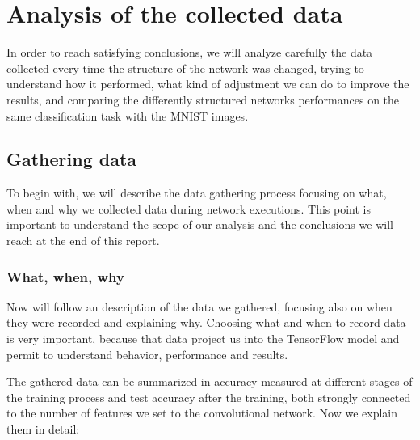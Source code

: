 \chapter{Analysis of the collected data}\label{ch:data_analysis}

In order to reach satisfying conclusions, we will analyze carefully the data collected every time the structure of the network was changed, trying to understand how it performed, what kind of adjustment we can do to improve the results, and comparing the differently structured networks performances on the same classification task with the \acs{MNIST} images.

\section{Gathering data}

To begin with, we will describe the data gathering process focusing on what, when and why we collected data during network executions. This point is important to understand the scope of our analysis and the conclusions we will reach at the end of this report.

\subsection{What, when, why}

Now will follow an description of the data we gathered, focusing also on when they were recorded and explaining why. Choosing what and when to record data is very important, because that data project us into the TensorFlow model and permit to understand behavior, performance and results.

The gathered data can be summarized in accuracy measured at different stages of the training process and test accuracy after the training, both strongly connected to the number of features we set to the convolutional network. Now we explain them in detail:


